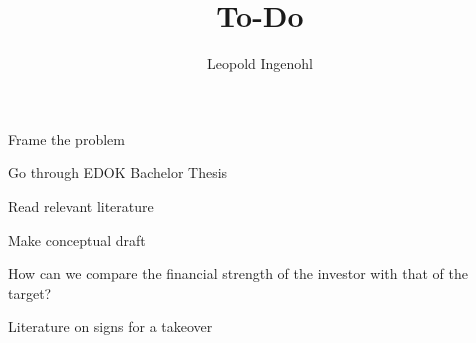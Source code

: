 \documentclass{article}
\title{To-Do}
\author{Leopold Ingenohl}
\newcommand{\cmark}{\ding{51}}%
\newcommand{\done}{\rlap{$\square$}{\raisebox{2pt}{\large\hspace{1pt}\cmark}}%
\hspace{-2.5pt}}
\begin{document}
\maketitle


  \begin{todolist}
  \item[\done] Frame the problem
  \end{todolist}

\begin{todolist}
  \item Go through EDOK Bachelor Thesis
  \item Read relevant literature
  \item Make conceptual draft 
  \item How can we compare the financial strength of the investor with that of the target?
  \item Literature on signs for a takeover 
\end{todolist}
\end{document}
